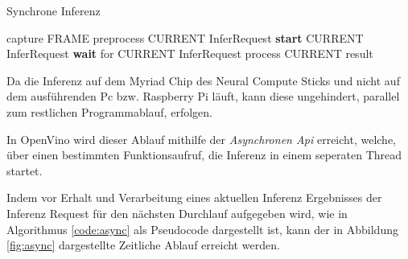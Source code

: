 \vspace{1cm}
\begin{minipage}{0.1\textwidth}
  \hfill
\end{minipage}
\begin{minipage}{0.5\textwidth}
  \begin{algorithm}[H]
    \caption{Synchrone Inferenz}
    \label{code:sync}
    \begin{algorithmic}
    \WHILE{\TRUE}
        \STATE capture FRAME
        \STATE preprocess CURRENT InferRequest
        \STATE \textbf{start} CURRENT InferRequest
        \STATE \textbf{wait} for CURRENT InferRequest
        \STATE process CURRENT result
    \ENDWHILE
    \end{algorithmic}
  \end{algorithm}  
\end{minipage}
\begin{minipage}{0.4\textwidth}
  \centering
  \vspace{1cm}
  \def\svgwidth{0.5\textwidth}
  
\end{minipage}

\vspace{1cm}
\begin{figure}[H]
  \centering
  \def\svgwidth{0.9\textwidth}
  
  \caption{}
  \label{fig:sync}
\end{figure}


Da die Inferenz auf dem Myriad Chip des Neural Compute Sticks
und nicht auf dem ausführenden Pc bzw. Raspberry Pi läuft,
kann diese ungehindert, parallel zum restlichen Programmablauf, 
erfolgen.

In OpenVino wird dieser Ablauf mithilfe der \textit{Asynchronen Api}
erreicht, welche, über einen bestimmten Funktionsaufruf,
die Inferenz in einem seperaten Thread startet.

Indem vor Erhalt und Verarbeitung eines aktuellen 
Inferenz Ergebnisses der Inferenz Request für
den nächsten Durchlauf aufgegeben wird, wie in Algorithmus
\ref{code:async} als Pseudocode dargestellt ist, kann der in
Abbildung \ref{fig:async} dargestellte Zeitliche Ablauf erreicht werden.



